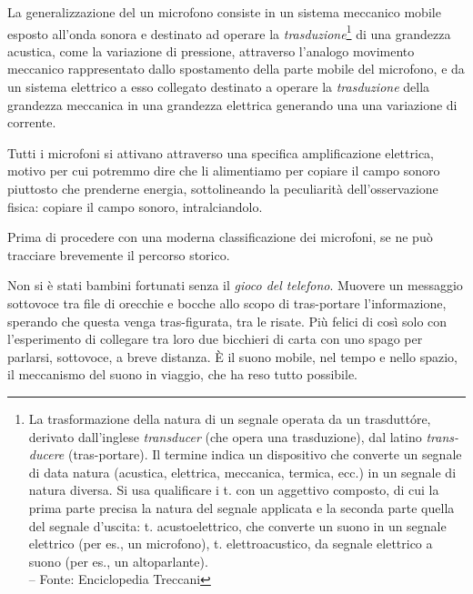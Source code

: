 \begin{refsection}
La generalizzazione del un microfono consiste in un sistema meccanico mobile esposto
all’onda sonora e destinato ad operare la \emph{trasduzione}\footnote{La
trasformazione della natura di un segnale operata da un trasduttóre,
derivato dall'inglese \emph{transducer} (che opera una trasduzione), dal latino
\emph{trans-ducere} (tras-portare). Il termine indica un dispositivo che converte
un segnale di data natura (acustica, elettrica, meccanica, termica, ecc.) in un
segnale di natura diversa. Si usa qualificare i t. con un aggettivo composto,
di cui la prima parte precisa la natura del segnale applicata e la seconda
parte quella del segnale d'uscita: t. acustoelettrico, che converte un suono in
un segnale elettrico (per es., un microfono), t. elettroacustico, da segnale
elettrico a suono (per es., un altoparlante). \\ – Fonte: Enciclopedia Treccani}
di una grandezza acustica, come la variazione di pressione, attraverso l'analogo
movimento meccanico rappresentato dallo spostamento della parte mobile del microfono, e da un sistema
elettrico a esso collegato destinato a operare la \emph{trasduzione} della
grandezza meccanica in una grandezza elettrica generando una una variazione di
corrente.

Tutti i microfoni si attivano attraverso una specifica amplificazione elettrica,
motivo per cui potremmo dire che li alimentiamo per copiare il campo sonoro
piuttosto che prenderne energia, sottolineando la peculiarità dell'osservazione
fisica: copiare il campo sonoro, intralciandolo.

Prima di procedere con una moderna classificazione dei microfoni, se ne può tracciare
brevemente il percorso storico.

Non si è stati bambini fortunati senza il \emph{gioco del telefono}. Muovere
un messaggio sottovoce tra file di orecchie e bocche allo scopo di tras-portare
l'informazione, sperando che questa venga tras-figurata, tra le risate. Più
felici di così solo con l'esperimento di collegare tra loro due bicchieri di carta con
uno spago per parlarsi, sottovoce, a breve distanza. È il suono mobile, nel tempo
e nello spazio, il meccanismo del suono in viaggio, che ha reso tutto possibile.


\end{refsection}
